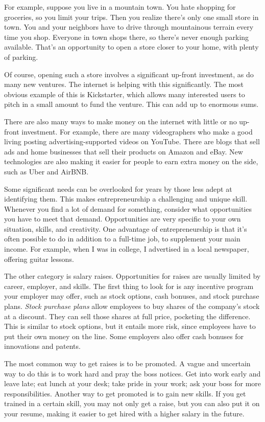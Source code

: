 For example, suppose you live in a mountain town. You hate shopping for groceries, so you limit your trips. Then you realize there's only one small store in town. You and your neighbors have to drive through mountainous terrain every time you shop. Everyone in town shops there, so there's never enough parking available. That's an opportunity to open a store closer to your home, with plenty of parking.

Of course, opening such a store involves a significant up-front investment, as do many new ventures. The internet is helping with this significantly. The most obvious example of this is Kickstarter, which allows many interested users to pitch in a small amount to fund the venture. This can add up to enormous sums.

There are also many ways to make money on the internet with little or no up-front investment. For example, there are many videographers who make a good living posting advertising-supported videos on YouTube. There are blogs that sell ads and home businesses that sell their products on Amazon and eBay. New technologies are also making it easier for people to earn extra money on the side, such as Uber and AirBNB.

Some significant needs can be overlooked for years by those less adept at identifying them. This makes entrepreneurship a challenging and unique skill. Whenever you find a lot of demand for something, consider what opportunities you have to meet that demand. Opportunities are very specific to your own situation, skills, and creativity. One advantage of entrepreneurship is that it's often possible to do in addition to a full-time job, to supplement your main income. For example, when I was in college, I advertised in a local newspaper, offering guitar lessons.

The other category is salary raises. Opportunities for raises are usually limited by career, employer, and skills. The first thing to look for is any incentive program your employer may offer, such as stock options, cash bonuses, and stock purchase plans. \emph{Stock purchase plans} allow employees to buy shares of the company's stock at a discount. They can sell those shares at full price, pocketing the difference. This is similar to stock options, but it entails more risk, since employees have to put their own money on the line. Some employers also offer cash bonuses for innovations and patents.

The most common way to get raises is to be promoted. A vague and uncertain way to do this is to work hard and pray the boss notices. Get into work early and leave late; eat lunch at your desk; take pride in your work; ask your boss for more responsibilities. Another way to get promoted is to gain new skills. If you get trained in a certain skill, you may not only get a raise, but you can also put it on your resume, making it easier to get hired with a higher salary in the future.

